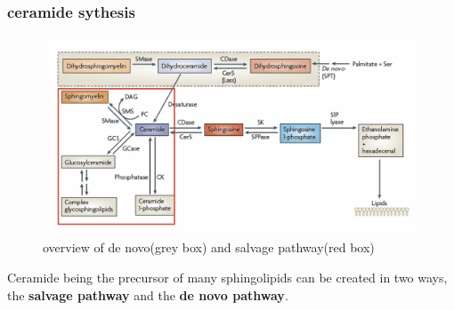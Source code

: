 \documentclass[../main.tex]{subfiles}
\begin{document}
\subsubsection{ceramide sythesis}
\begin{figure}[H]
    \centering
    \includegraphics[width=0.7\linewidth]{overviewSphingolipidsSythesis.png}
    \caption{overview of de novo(grey box) and salvage pathway(red box)}
    \label{fig:enter-label}
\end{figure}
Ceramide being the precursor of many sphingolipids can be created in two ways, the \textbf{salvage pathway} and the \textbf{de novo pathway}.
\end{document}
